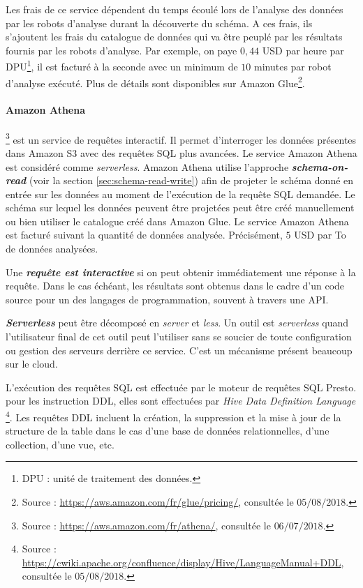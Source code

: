 Les frais de ce service dépendent du temps écoulé lors de l'analyse des données par les robots d'analyse durant la découverte du schéma. A ces frais, ils s'ajoutent les frais du catalogue de données qui va être peuplé par les résultats fournis par les robots d'analyse. Par exemple, on paye $ 0,44 $ USD par heure par DPU\footnote{DPU : unité de traitement des données.}, il est facturé à la seconde avec un minimum de $ 10 $ minutes par robot d'analyse exécuté. Plus de détails sont disponibles sur Amazon Glue\footnote{Source : \url{https://aws.amazon.com/fr/glue/pricing/}, consultée le $05/08/2018$.}.

\paragraph{Amazon Athena}\label{aws:athena}\footnote{Source : \url{https://aws.amazon.com/fr/athena/}, consultée le $06/07/2018$.} est un service de requêtes  interactif. Il permet d'interroger les données présentes dans Amazon S3 avec des requêtes SQL plus avancées. Le service Amazon Athena est considéré comme \textit{serverless}. Amazon Athena utilise l'approche \textbf{\textit{schema-on-read}} (voir la section \ref{sec:schema-read-write}) afin de projeter le schéma donné en entrée sur les données au moment de l'exécution de la requête SQL demandée. Le schéma sur lequel les données peuvent être projetées peut être créé manuellement ou bien utiliser le catalogue créé dans Amazon Glue.
Le service Amazon Athena est facturé suivant la quantité de données analysée. Précisément, $ 5 $ USD par To de données analysées.


\begin{tcolorbox}
	Une \textbf{\textit{requête est	interactive}} si on peut  obtenir immédiatement une réponse à la requête.  Dans le cas échéant, les résultats sont obtenus  dans le cadre d'un code source pour un des langages de programmation, souvent à travers une API.
\end{tcolorbox}

\begin{tcolorbox}
	\textbf{\textit{Serverless}} peut être décomposé en \textit{server} et \textit{less}. Un outil est \textit{serverless} quand l'utilisateur final de cet outil peut l'utiliser sans se soucier de toute configuration ou gestion des serveurs derrière ce service. C'est un mécanisme présent beaucoup sur le cloud.
\end{tcolorbox}

L'exécution des requêtes SQL est effectuée par le moteur de requêtes SQL Presto. pour les instruction DDL, elles sont effectuées par  \textit{Hive Data Definition Language} \footnote{Source : \url{https://cwiki.apache.org/confluence/display/Hive/LanguageManual+DDL}, consultée le $05/08/2018$.}. Les requêtes DDL incluent la création, la suppression et la mise à jour de la structure de la table dans le cas d'une base de données relationnelles, d'une collection, d'une vue, etc. 



